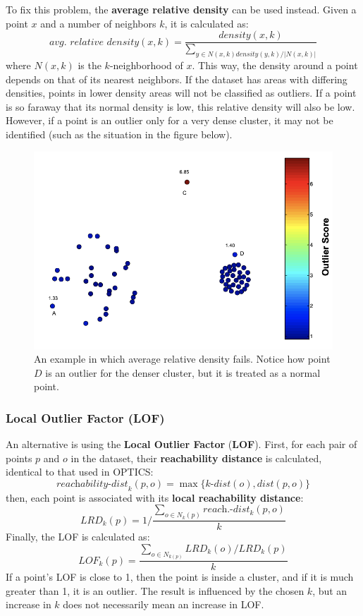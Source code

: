 To fix this problem, the \textbf{average relative density} can be used instead. Given a point $x$ and a number of neighbors $k$, it is calculated as:
\begin{equation*}
    \textit{avg. relative density}(x,k) = \dfrac{\textit{density}(x,k)}{\sum_{y \in N(x,k) \textit{density}(y,k)/|N(x,k)|}}
\end{equation*}
where $N(x,k)$ is the $k$-neighborhood of $x$. This way, the density around a point depends on that of its nearest neighbors. If the dataset has areas with differing densities, points in lower density areas will not be classified as outliers. If a point is so faraway that its normal density is low, this relative density will also be low. However, if a point is an outlier only for a very dense cluster, it may not be identified (such as the situation in the figure below).
\begin{figure}[ht]
    \centering
    \includegraphics[width=0.5\linewidth]{img/relative_density.png}
    \caption{An example in which average relative density fails. Notice how point $D$ is an outlier for the denser cluster, but it is treated as a normal point.}
    \label{fig:relative-dist}
\end{figure}

\subsubsection{Local Outlier Factor (LOF)}

An alternative is using the \textbf{Local Outlier Factor} (\textbf{LOF}). First, for each pair of points $p$ and $o$ in the dataset, their \textbf{reachability distance} is calculated, identical to that used in OPTICS:
\begin{equation*}
    \textit{reachability-dist}_k(p,o) = \max \{\textit{k-dist}(o), \textit{dist}(p,o)\}
\end{equation*}
then, each point is associated with its \textbf{local reachability distance}:
\begin{equation*}
    \textit{LRD}_k(p) = 1 / \dfrac{\sum_{o \in N_k(p)} \textit{reach.-dist}_k(p,o)}{k}
\end{equation*}
Finally, the LOF is calculated as:
\begin{equation*}
    \textit{LOF}_{\textit{k}}(p) = \dfrac{\sum_{o \in N_{k(p)}} \textit{LRD}_k(o) / \textit{LRD}_k(p) }{k}
\end{equation*}
If a point's LOF is close to 1, then the point is inside a cluster, and if it is much greater than 1, it is an outlier. The result is influenced by the chosen $k$, but an increase in $k$ does not necessarily mean an increase in LOF.

